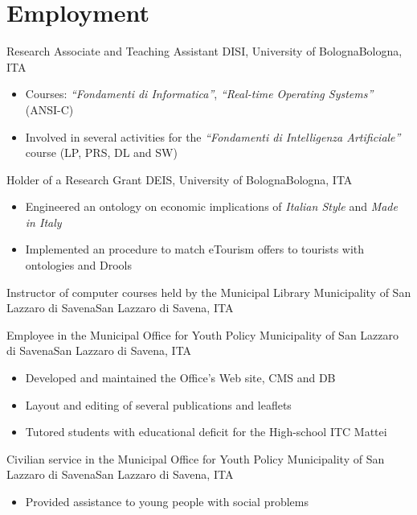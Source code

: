 \section{Employment}

%
{Research Associate and Teaching Assistant}%
{DISI, University of Bologna}{Bologna, ITA}{}{\begin{itemize}
\item Courses: \emph{``Fondamenti di Informatica''}, \emph{``Real\--time Operating Systems''} (ANSI\--C)
\item Involved in several activities for the \emph{``Fondamenti di Intelligenza Artificiale''} course (LP, PRS, DL and SW)
\end{itemize}}

%
{Holder of a Research Grant}%
{DEIS, University of Bologna}{Bologna, ITA}{}{\begin{itemize}
\item Engineered an ontology on economic implications of \emph{Italian Style} and \emph{Made in Italy}
\item Implemented an procedure to match eTourism offers to tourists with ontologies and Drools
\end{itemize}}

%
{Instructor of computer courses held by the Municipal Library}%
{Municipality of San Lazzaro di Savena}{San Lazzaro di Savena, ITA}{}{}

%
{Employee in the Municipal Office for Youth Policy}%
{Municipality of San Lazzaro di Savena}{San Lazzaro di Savena, ITA}{}{\begin{itemize}
\item Developed and maintained the Office's Web site, CMS and DB
\item Layout and editing of several publications and leaflets
\item Tutored students with educational deficit for the High\--school ITC Mattei
\end{itemize}}

%
{Civilian service in the Municipal Office for Youth Policy}%
{Municipality of San Lazzaro di Savena}{San Lazzaro di Savena, ITA}{}{\begin{itemize}
\item Provided assistance to young people with social problems
\end{itemize}}

